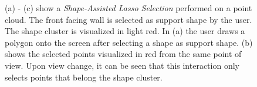 \begin{figure}
\centering
{}\par\medskip
{}\par\medskip        
{}
\caption{(a) - (c) show a \textit{Shape-Assisted Lasso Selection} performed on a point cloud. The front facing wall is selected as support shape by the user. The shape cluster is visualized in light red. In (a) the user draws a polygon onto the screen after selecting a shape as support shape. (b) shows the selected points visualized in red from the same point of view. Upon view change, it can be seen that this interaction only selects points that belong the shape cluster. }
\label{fig:lasso_assisted}
\end{figure}


